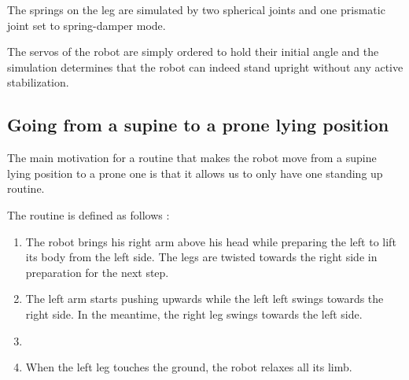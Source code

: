 The springs on the leg are simulated by two spherical joints and one prismatic joint set to spring-damper mode.

The servos of the robot are simply ordered to hold their initial angle and the simulation determines that the robot can indeed stand upright without any active stabilization.

\subsection{Going from a supine to a prone lying position}
The main motivation for a routine that makes the robot move from a supine lying position to a prone one is that it allows us to only have one standing up routine. 

The routine is defined as follows :\begin{enumerate}
\item The robot brings his right arm above his head while preparing the left to lift its body from the left side. The legs are twisted towards the right side in preparation for the next step.

\item The left arm starts pushing upwards while the left left swings towards the right side. In the meantime, the right leg swings towards the left side. 

\item 

\item When the left leg touches the ground, the robot relaxes all its limb.
\end{enumerate}

